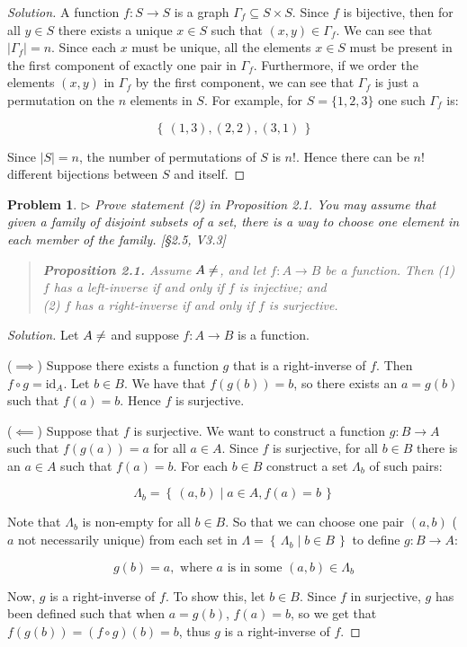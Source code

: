 \documentclass[fontsize=14pt]{scrartcl}
\newtheorem{problem-internal}{Problem}[subsection]
\newenvironment{problem}{
  \medskip
  \begin{problem-internal}
}{
  \end{problem-internal}
}
\newenvironment{solution}{
  \begin{proof}[Solution]
  \vspace{-8px}
  \setlength{\parskip}{4px}
  \setlength{\parindent}{0px}
}{
  \end{proof}
}
\newcommand{\set}[1]{\left\{\,#1\,\right\}}
\newcommand{\id}{\mathrm{id}}
\newcommand{\abs}[1]{\left|#1\right|}
\begin{document}
\begin{solution}
A function $f:S\to S$ is a graph $\Gamma_f\subseteq S\times S$. Since $f$ is
bijective, then for all $y\in S$ there exists a unique $x\in S$ such that
$(x,y)\in\Gamma_f$. We can see that $\abs{\Gamma_f} = n$. Since each $x$ must be
unique, all the elements $x\in S$ must be present in the first component of
exactly one pair in $\Gamma_f$. Furthermore, if we order the elements $(x,y)$ in
$\Gamma_f$ by the first component, we can see that $\Gamma_f$ is just a
permutation on the $n$ elements in $S$. For example, for $S=\{1,2,3\}$ one such
$\Gamma_f$ is:

\[ \set{ (1,3), (2,2), (3,1) } \]

Since $\abs{S} = n$, the number of permutations of $S$ is $n!$. Hence there can be
$n!$ different bijections between $S$ and itself.
\end{solution}


\begin{problem}
$\rhd$ Prove statement (2) in Proposition 2.1. You may assume that given a
family of disjoint subsets of a set, there is a way to choose one element in
each member of the family. [\S2.5, V3.3]

\begin{quote} \textbf{Proposition 2.1.} Assume $A\neq\empty$, and let $f:A\to B$ be a function. Then
(1) $f$ has a left-inverse if and only if $f$ is injective; and \\
(2) $f$ has a right-inverse if and only if $f$ is surjective.
\end{quote}
\end{problem}

\begin{solution}
Let $A\neq\empty$ and suppose $f:A\to B$ is a function.

($\implies$) Suppose there exists a function $g$ that is a right-inverse of $f$.
Then $f\circ g = \id_A$. Let $b\in B$. We have that $f(g(b)) = b$, so there
exists an $a = g(b)$ such that $f(a) = b$. Hence $f$ is surjective.

($\impliedby$) Suppose that $f$ is surjective. We want to construct a function
$g:B\to A$ such that $f(g(a)) = a$ for all $a\in A$. Since $f$ is surjective,
for all $b\in B$ there is an $a\in A$ such that $f(a) = b$. For each $b\in B$
construct a set $\Lambda_b$ of such pairs:

\[ \Lambda_b = \set{ (a,b) \mid a \in A, f(a) = b } \]

Note that $\Lambda_b$ is non-empty for all $b\in B$. So that we can choose one
pair $(a,b)$ ($a$ not necessarily unique) from each set in $\Lambda =
\set{\Lambda_b\mid b\in B}$ to define $g:B\to A$:

\[ g(b) = a, \text{ where $a$ is in some $(a,b)\in\Lambda_b$} \]

Now, $g$ is a right-inverse of $f$. To show this, let $b\in B$. Since $f$ in
surjective, $g$ has been defined such that when $a=g(b)$, $f(a)=b$, so we get
that $f(g(b)) = (f\circ g)(b) = b$, thus $g$ is a right-inverse of $f$.
\end{solution}
\end{document}
